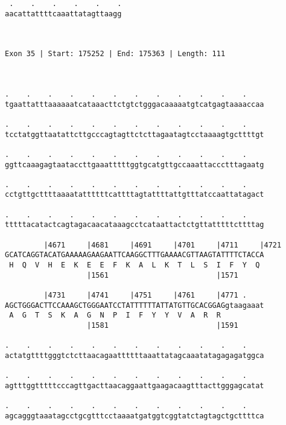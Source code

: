 \documentclass{article}
\begin{document}
\begin{Verbatim}
 .    .    .    .    .    .
aacattattttcaaattatagttaagg
                           
                           
 
Exon 35 | Start: 175252 | End: 175363 | Length: 111



.    .    .    .    .    .    .    .    .    .    .    .    
tgaattatttaaaaaatcataaacttctgtctgggacaaaaatgtcatgagtaaaaccaa
                                                            
.    .    .    .    .    .    .    .    .    .    .    .    
tcctatggttaatattcttgcccagtagttctcttagaatagtcctaaaagtgcttttgt
                                                            
.    .    .    .    .    .    .    .    .    .    .    .    
ggttcaaagagtaataccttgaaatttttggtgcatgttgccaaattaccctttagaatg
                                                            
.    .    .    .    .    .    .    .    .    .    .    .    
cctgttgcttttaaaatattttttcattttagtattttattgtttatccaattatagact
                                                            
.    .    .    .    .    .    .    .    .    .    .    .    
tttttacatactcagtagacaacataaagcctcataattactctgttatttttcttttag
                                                            
         |4671     |4681     |4691     |4701     |4711     |4721
GCATCAGGTACATGAAAAAGAAGAATTCAAGGCTTTGAAAACGTTAAGTATTTTCTACCA
 H  Q  V  H  E  K  E  E  F  K  A  L  K  T  L  S  I  F  Y  Q 
                   |1561                         |1571      
  
         |4731     |4741     |4751     |4761     |4771 .    
AGCTGGGACTTCCAAAGCTGGGAATCCTATTTTTTATTATGTTGCACGGAGgtaagaaat
 A  G  T  S  K  A  G  N  P  I  F  Y  Y  V  A  R  R          
                   |1581                         |1591      
  
.    .    .    .    .    .    .    .    .    .    .    .    
actatgttttgggtctcttaacagaattttttaaattatagcaaatatagagagatggca
                                                            
.    .    .    .    .    .    .    .    .    .    .    .    
agtttggtttttcccagttgacttaacaggaattgaagacaagtttacttgggagcatat
                                                            
.    .    .    .    .    .    .    .    .    .    .    .    
agcagggtaaatagcctgcgtttcctaaaatgatggtcggtatctagtagctgcttttca
                                                            

\end{Verbatim}
\end{document}
